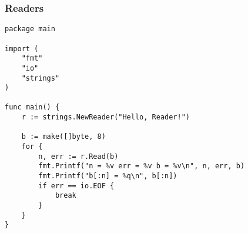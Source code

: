 \begin{frame}[fragile]
\frametitle{Readers}

\begin{lstlisting}
package main

import (
    "fmt"
    "io"
    "strings"
)

func main() {
    r := strings.NewReader("Hello, Reader!")

    b := make([]byte, 8)
    for {
        n, err := r.Read(b)
        fmt.Printf("n = %v err = %v b = %v\n", n, err, b)
        fmt.Printf("b[:n] = %q\n", b[:n])
        if err == io.EOF {
            break
        }
    }
}
\end{lstlisting}
\end{frame}